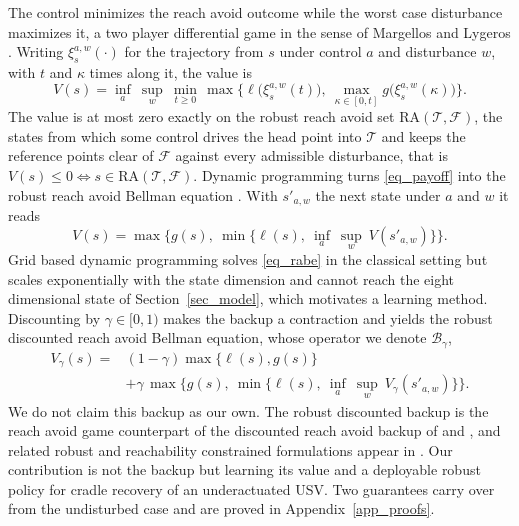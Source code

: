 \documentclass[5p,times,authoryear]{elsarticle}
\begin{document}
The control minimizes the reach avoid outcome while the worst case disturbance maximizes it, a two player differential game in the sense of Margellos and Lygeros \citep{margellos2011hamilton, fisac2015reach, hsu2021safety}. Writing $\xi^{a,w}_s(\cdot)$ for the trajectory from $s$ under control $a$ and disturbance $w$, with $t$ and $\kappa$ times along it, the value is
\begin{equation}\label{eq_payoff}
V(s) = \inf_{a}\ \sup_{w}\ \min_{t\ge 0}\, \max\Big\{ \ell\big(\xi^{a,w}_s(t)\big),\ \max_{\kappa\in[0,t]} g\big(\xi^{a,w}_s(\kappa)\big) \Big\}.
\end{equation}
The value is at most zero exactly on the robust reach avoid set $\mathrm{RA}(\mathcal{T},\mathcal{F})$, the states from which some control drives the head point into $\mathcal{T}$ and keeps the reference points clear of $\mathcal{F}$ against every admissible disturbance, that is $V(s)\le 0 \iff s\in\mathrm{RA}(\mathcal{T},\mathcal{F})$. Dynamic programming turns \eqref{eq_payoff} into the robust reach avoid Bellman equation \citep{hsu2021safety}. With $s'_{a,w}$ the next state under $a$ and $w$ it reads
\begin{equation}\label{eq_rabe}
V(s) = \max\Big\{ g(s),\ \min\big\{ \ell(s),\ \inf_{a}\ \sup_{w}\ V(s'_{a,w}) \big\} \Big\}.
\end{equation}
Grid based dynamic programming solves \eqref{eq_rabe} in the classical setting but scales exponentially with the state dimension and cannot reach the eight dimensional state of Section~\ref{sec_model}, which motivates a learning method. Discounting by $\gamma\in[0,1)$ makes the backup a contraction \citep{fisac2019bridging, hsu2021safety} and yields the robust discounted reach avoid Bellman equation, whose operator we denote $\mathcal{B}_\gamma$,
\begin{equation}\label{eq_drabe}
\begin{aligned}
V_\gamma(s) = {}& (1-\gamma)\max\{\ell(s), g(s)\} \\
&+ \gamma\,\max\Big\{ g(s),\ \min\big\{ \ell(s),\ \inf_{a}\ \sup_{w}\ V_\gamma(s'_{a,w}) \big\} \Big\}.
\end{aligned}
\end{equation}
We do not claim this backup as our own. The robust discounted backup is the reach avoid game counterpart of the discounted reach avoid backup of \citet{hsu2021safety} and \citet{fisac2019bridging}, and related robust and reachability constrained formulations appear in \citet{li2023robust, hsu2023isaacs, yu2022reachability}. Our contribution is not the backup but learning its value and a deployable robust policy for cradle recovery of an underactuated USV. Two guarantees carry over from the undisturbed case and are proved in Appendix~\ref{app_proofs}.
\end{document}
